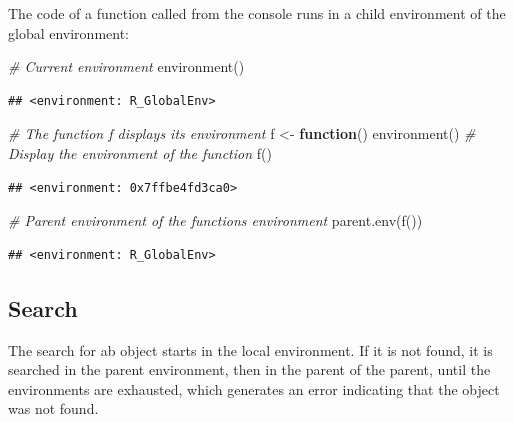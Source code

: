 \documentclass[
  12pt,
  american,
  a4paper,
  extrafontsizes,onecolumn,openright
  ]{memoir}
\newenvironment{Shaded}{\begin{snugshade}}{\end{snugshade}}
\newcommand{\CommentTok}[1]{\textcolor[rgb]{0.56,0.35,0.01}{\textit{#1}}}
\newcommand{\ControlFlowTok}[1]{\textcolor[rgb]{0.13,0.29,0.53}{\textbf{#1}}}
\newcommand{\FunctionTok}[1]{\textcolor[rgb]{0.00,0.00,0.00}{#1}}
\newcommand{\NormalTok}[1]{#1}
\newcommand{\OtherTok}[1]{\textcolor[rgb]{0.56,0.35,0.01}{#1}}
\begin{document}
\normalsize

The code of a function called from the console runs in a child environment of the global environment:

\scriptsize

\begin{Shaded}
\begin{Highlighting}[]
\CommentTok{\# Current environment}
\FunctionTok{environment}\NormalTok{()}
\end{Highlighting}
\end{Shaded}

\begin{verbatim}
## <environment: R_GlobalEnv>
\end{verbatim}

\begin{Shaded}
\begin{Highlighting}[]
\CommentTok{\# The function f displays its environment}
\NormalTok{f }\OtherTok{\textless{}{-}} \ControlFlowTok{function}\NormalTok{() }\FunctionTok{environment}\NormalTok{()}
\CommentTok{\# Display the environment of the function}
\FunctionTok{f}\NormalTok{()}
\end{Highlighting}
\end{Shaded}

\begin{verbatim}
## <environment: 0x7ffbe4fd3ca0>
\end{verbatim}

\begin{Shaded}
\begin{Highlighting}[]
\CommentTok{\# Parent environment of the function\textquotesingle{}s environment}
\FunctionTok{parent.env}\NormalTok{(}\FunctionTok{f}\NormalTok{())}
\end{Highlighting}
\end{Shaded}

\begin{verbatim}
## <environment: R_GlobalEnv>
\end{verbatim}

\normalsize

\hypertarget{search}{%
\subsection{Search}\label{search}}

The search for ab object starts in the local environment.
If it is not found, it is searched in the parent environment, then in the parent of the parent, until the environments are exhausted, which generates an error indicating that the object was not found.
\end{document}
